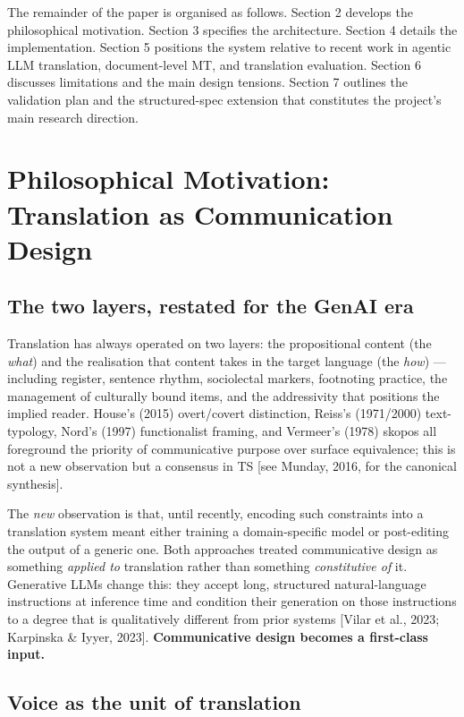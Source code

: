 \documentclass[11pt]{article}
\begin{document}
The remainder of the paper is organised as follows. Section 2 develops the philosophical motivation. Section 3 specifies the architecture. Section 4 details the implementation. Section 5 positions the system relative to recent work in agentic LLM translation, document-level MT, and translation evaluation. Section 6 discusses limitations and the main design tensions. Section 7 outlines the validation plan and the structured-spec extension that constitutes the project's main research direction.

\section{Philosophical Motivation: Translation as Communication Design}

\subsection{The two layers, restated for the GenAI era}

Translation has always operated on two layers: the propositional content (the \emph{what}) and the realisation that content takes in the target language (the \emph{how}) --- including register, sentence rhythm, sociolectal markers, footnoting practice, the management of culturally bound items, and the addressivity that positions the implied reader. House's (2015) overt/covert distinction, Reiss's (1971/2000) text-typology, Nord's (1997) functionalist framing, and Vermeer's (1978) skopos all foreground the priority of communicative purpose over surface equivalence; this is not a new observation but a consensus in TS [see Munday, 2016, for the canonical synthesis].

The \emph{new} observation is that, until recently, encoding such constraints into a translation system meant either training a domain-specific model or post-editing the output of a generic one. Both approaches treated communicative design as something \emph{applied to} translation rather than something \emph{constitutive of} it. Generative LLMs change this: they accept long, structured natural-language instructions at inference time and condition their generation on those instructions to a degree that is qualitatively different from prior systems [Vilar et al., 2023; Karpinska \& Iyyer, 2023]. \textbf{Communicative design becomes a first-class input.}

\subsection{Voice as the unit of translation}
\end{document}

